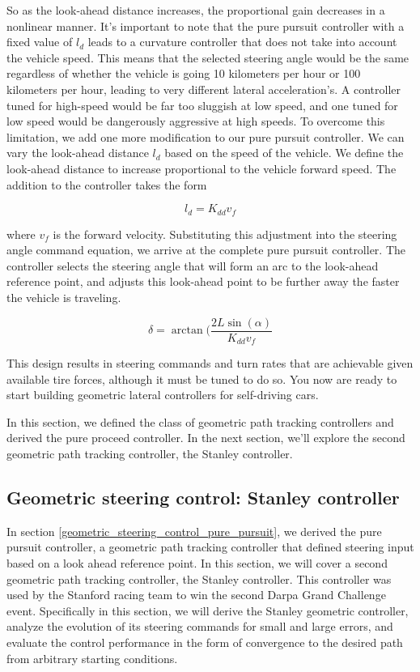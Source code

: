 So as the look-ahead distance increases, the proportional gain decreases in a nonlinear manner. It's important to note that the pure pursuit controller with a fixed value of $l_d$ leads to a curvature controller that does not take into account the vehicle speed. This means that the selected steering angle would be the same regardless of whether the vehicle is going 10 kilometers per hour or 100 kilometers per hour, leading to very different lateral acceleration's. A controller tuned for high-speed would be far too sluggish at low speed, and one tuned for low speed would be dangerously aggressive at high speeds. To overcome this limitation, we add one more modification to our pure pursuit controller. We can vary the look-ahead distance $l_d$ based on the speed of the vehicle. We define the look-ahead distance to increase proportional to the vehicle forward speed. The addition to the controller takes the form

\begin{equation}
l_d = K_{dd}v_f
\end{equation}

where $v_f$ is the forward velocity. Substituting this adjustment into the steering angle command equation, we arrive at the complete pure pursuit controller. 
The controller selects the steering angle that will form an arc to the look-ahead reference point, and adjusts this look-ahead point to be further away the faster the vehicle is traveling. 

\begin{equation}
\delta = \arctan(\frac{2L\sin(\alpha)}{K_{dd}v_f}
\end{equation}

This design results in steering commands and turn rates that are achievable given available tire forces, although it must be tuned to do so. You now are ready to start building geometric lateral controllers for self-driving cars. 

In this section, we defined the class of geometric path tracking controllers and derived the pure proceed controller.
In the next section, we'll explore the second geometric path tracking controller, the Stanley controller. 

\subsection{Geometric steering control: Stanley controller}
\label{geometric_steering_control_stanley_controller}

In section \ref{geometric_steering_control_pure_pursuit}, we derived the pure pursuit controller, a geometric path tracking controller 
that defined steering input based on a look ahead reference point. In this section, we will cover a second geometric path tracking controller, the Stanley controller. 
This controller was used by the Stanford racing team to win the second Darpa Grand Challenge event. 
Specifically in this section, we will derive the Stanley geometric controller, analyze the evolution of its steering commands 
for small and large errors, and evaluate the control performance in the form of convergence to the desired path 
from arbitrary starting conditions. 

